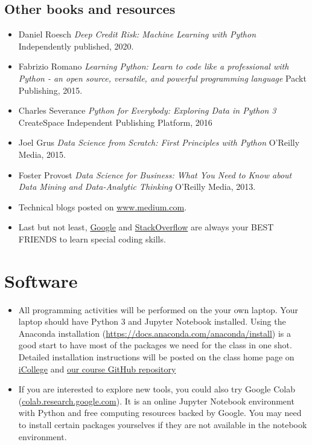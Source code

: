 \documentclass[a4paper, 12pt]{article}
\begin{document}
\subsection{Other books and resources}
  \begin{itemize}
    \item Daniel Roesch \textit{Deep Credit Risk: Machine Learning with Python} Independently published, 2020.
  	\item Fabrizio Romano  \textit{Learning Python: Learn to code like a professional with Python - an open source, versatile, and powerful programming language} Packt Publishing, 2015.
  	\item Charles Severance \textit{Python for Everybody: Exploring Data in Python 3} CreateSpace Independent Publishing Platform, 2016 
    \item Joel Grus \textit{Data Science from Scratch: First Principles with Python} O'Reilly Media, 2015.
    \item Foster Provost \textit{Data Science for Business: What You Need to Know about Data Mining and Data-Analytic Thinking} O'Reilly Media, 2013.
    \item Technical blogs posted on \url{www.medium.com}.
    \item Last but not least, \href{www.google.com}{Google} and \href{www.stackoverflow.com}{StackOverflow} are always your BEST FRIENDS to learn special coding skills.
  \end{itemize}

\section{Software}
\begin{itemize}
    \item All programming activities will be performed on the your own laptop. Your laptop should have Python 3 and Jupyter Notebook installed. Using the Anaconda installation (\url{https://docs.anaconda.com/anaconda/install}) is a good start to have most of the packages we need for the class in one shot. Detailed installation instructions will be posted on the class home page on \href{https://gastate.view.usg.edu/d2l/home/xxxxxxxtbd}{iCollege} and \href{https://github.com/xiangshiyin/machine-learning-for-actuarial-science}{our course GitHub repository}
    \item If you are interested to explore new tools, you could also try Google Colab (\url{colab.research.google.com}). It is an online Jupyter Notebook environment with Python and free computing resources backed by Google. You may need to install certain packages yourselves if they are not available in the notebook environment.
\end{itemize}  
\end{document}
